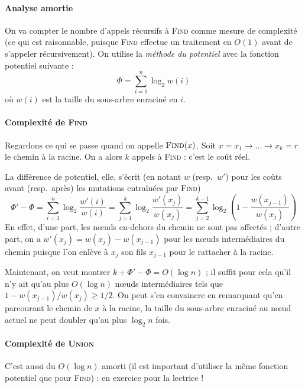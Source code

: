 \documentclass[a4paper, 11pt]{article}
\begin{document}
\newpage

\paragraph{Analyse amortie}

On va compter le nombre d'appels récursifs à \textsc{Find} comme mesure de
complexité (ce qui est raisonnable, puisque \textsc{Find} effectue un traitement
en $O(1)$ avant de s'appeler récursivement). On utilise la \emph{méthode du
  potentiel} avec la fonction potentiel suivante :
\[ \Phi = \sum_{i=1}^n \log_2 w(i) \]
où $w(i)$ est la taille du sous-arbre enraciné en $i$.

\paragraph{Complexité de \textsc{Find}}

Regardons ce qui se passe quand on appelle $\textsc{Find}(x)$. Soit $x = x_1
\rightarrow \ldots \rightarrow x_k = r$ le chemin à la racine. On a alors $k$
appels à \textsc{Find} : c'est le coût réel.

La différence de potentiel, elle, s'écrit (en notant $w$ (resp.\ $w'$) pour les
coûts avant (resp.\ après) les mutations entraînées par \textsc{Find})
\[ \Phi' - \Phi = \sum_{i=1}^n \log_2 \frac{w'(i)}{w(i)}
  = \sum_{j=1}^k \log_2 \frac{w'(x_j)}{w(x_j)}
  = \sum_{j=2}^{k-1} \log_2 \left(1 - \frac{w(x_{j-1})}{w(x_j)} \right)
\]
En effet, d'une part, les nœuds en-dehors du chemin ne sont pas affectés ;
d'autre part, on a $w'(x_j) = w(x_j) - w(x_{j-1})$ pour les nœuds intermédiaires
du chemin puisque l'on enlève à $x_j$ son fils $x_{j-1}$ pour le rattacher à la
racine.

Maintenant, on veut montrer $k + \Phi' - \Phi = O(\log n)$ ; il suffit pour cela
qu'il n'y ait qu'au plus $O(\log n)$ nœuds intermédiaires tels que
$1 - w(x_{j-1})/w(x_j) \geq 1/2$. On peut s'en convaincre en remarquant qu'en
parcourant le chemin de $x$ à la racine, la taille du sous-arbre enraciné au
nœud actuel ne peut doubler qu'au plus $\log_2 n$ fois.

\paragraph{Complexité de \textsc{Union}}

C'est aussi du $O(\log n)$ amorti (il est important d'utiliser la même fonction
potentiel que pour \textsc{Find}) : en exercice pour la lectrice !
\end{document}
